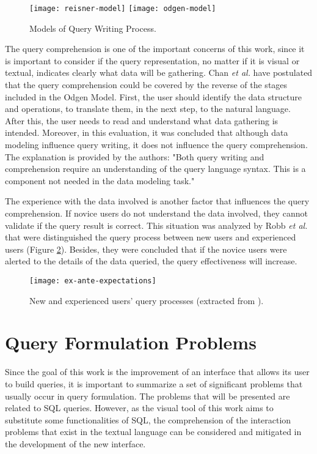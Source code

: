 \begin{figure}[htbp]
  \centering
    {\texttt{[image: reisner-model]}}%
    {\texttt{[image: odgen-model]}}%
\caption{Models of Query Writing Process.}
  \label{fig:models_of_query_writing_process}
\end{figure}

The query comprehension is one of the important concerns of this work, since it is important to consider if the query representation, no matter if it is visual or textual, indicates clearly what data will be gathering. %
Chan \textit{et al.} \cite{anEvaluationOfNoviceEndUserComputingPerformance} have postulated that the query comprehension could be covered by the reverse of the stages included in the Odgen Model. First, the user should identify the data structure and operations, to translate them, in the next step, to the natural language. After this, the user needs to read and understand what data gathering is intended. Moreover, in this evaluation, it was concluded that although data modeling influence query writing, it does not influence the query comprehension. The explanation is provided by the authors: "Both query writing and comprehension require an understanding of the query language syntax. This is a component not needed in the data modeling task."

The experience with the data involved is another factor that influences the query comprehension. If novice users do not understand the data involved, they cannot validate if the query result is correct. This situation was analyzed by Robb \textit{et al.} that were distinguished the query process between new users and experienced users (Figure \ref{fig:ex_ante_expectations}). Besides, they were concluded that if the novice users were alerted to the details of the data queried, the query effectiveness will increase.

\begin{figure}[htbp]
  \centering
    {\texttt{[image: ex-ante-expectations]}}%
\caption{New and experienced users’ query processes (extracted from \cite{improvingNewUsersQueryPerformance}).}
  \label{fig:ex_ante_expectations}
\end{figure}


\section{Query Formulation Problems}
\label{sec:query_formulation_problems}
Since the goal of this work is the improvement of an interface that allows its user to build queries, it is important to summarize a set of significant problems that usually occur in query formulation. The problems that will be presented are related to SQL queries. However, as the visual tool of this work aims to substitute some functionalities of SQL, the comprehension of the interaction problems that exist in the textual language can be considered and mitigated in the development of the new interface. 

